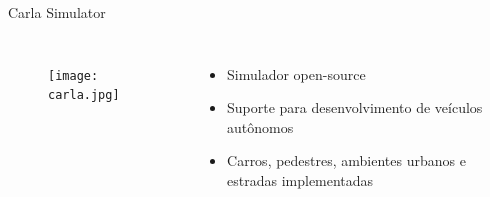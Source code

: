 \begin{frame}[t]{Carla Simulator} 
        \begin{columns}[t]
                \begin{figure}
                    \texttt{[image: carla.jpg]}
                \end{figure}
                \vspace*{1.5cm}
                \begin{itemize}
                    \item Simulador open-source
                    \item Suporte para desenvolvimento de veículos autônomos
                    \item Carros, pedestres, ambientes urbanos e estradas implementadas
                \end{itemize}
        \end{columns}
\end{frame}
